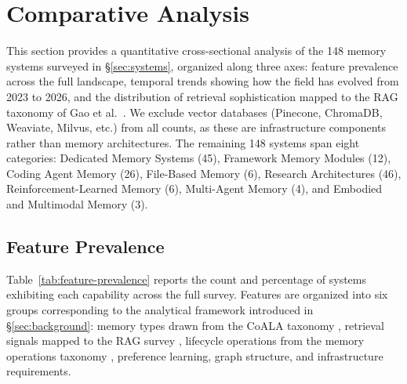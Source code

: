 \section{Comparative Analysis}
\label{sec:comparison}

This section provides a quantitative cross-sectional analysis of the 148 memory
systems surveyed in \S\ref{sec:systems}, organized along three axes: feature
prevalence across the full landscape, temporal trends showing how the field has
evolved from 2023 to 2026, and the distribution of retrieval sophistication
mapped to the RAG taxonomy of Gao et al.~\cite{gao2023rag}. We exclude vector
databases (Pinecone, ChromaDB, Weaviate, Milvus, etc.) from all counts, as
these are infrastructure components rather than memory architectures. The
remaining 148 systems span eight categories: Dedicated Memory Systems (45),
Framework Memory Modules (12), Coding Agent Memory (26), File-Based Memory (6),
Research Architectures (46), Reinforcement-Learned Memory (6), Multi-Agent
Memory (4), and Embodied and Multimodal Memory (3).

\subsection{Feature Prevalence}
\label{sec:feature-prevalence}

Table~\ref{tab:feature-prevalence} reports the count and percentage of systems
exhibiting each capability across the full survey. Features are organized into
six groups corresponding to the analytical framework introduced in
\S\ref{sec:background}: memory types drawn from the CoALA taxonomy
\cite{sumers2024coala}, retrieval signals mapped to the RAG survey
\cite{gao2023rag}, lifecycle operations from the memory operations taxonomy
\cite{zhang2024survey}, preference learning, graph structure, and
infrastructure requirements.

